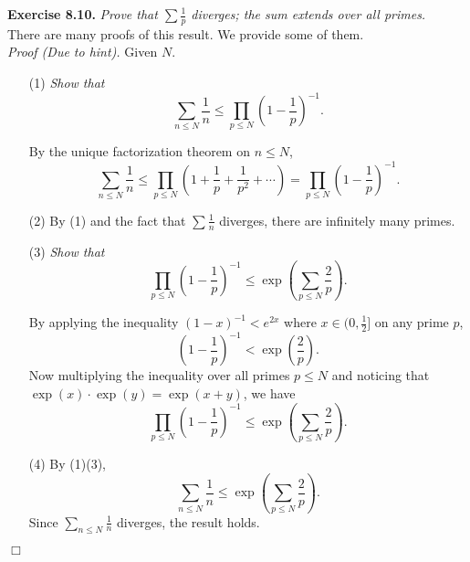 \documentclass{article}
\begin{document}
\textbf{Exercise 8.10.}
\emph{Prove that $\sum \frac{1}{p}$ diverges; the sum extends over all primes.} \\

There are many proofs of this result. We provide some of them. \\

\emph{Proof (Due to hint).}
Given $N$.
\begin{enumerate}
\item[(1)]
\emph{Show that
\[
  \sum_{n \leq N} \frac{1}{n}
  \leq \prod_{p \leq N} \left( 1 - \frac{1}{p} \right)^{-1}.
\]}

By the unique factorization theorem on $n \leq N$,
\[
  \sum_{n \leq N} \frac{1}{n}
  \leq \prod_{p \leq N} \left( 1 + \frac{1}{p} + \frac{1}{p^2} + \cdots \right)
  = \prod_{p \leq N} \left( 1 - \frac{1}{p} \right)^{-1}.
\]

\item[(2)]
By (1) and the fact that $\sum \frac{1}{n}$ diverges,
there are infinitely many primes.

\item[(3)]
\emph{Show that
\[
  \prod_{p \leq N} \left( 1 - \frac{1}{p} \right)^{-1}
  \leq \exp \left( \sum_{p \leq N} \frac{2}{p} \right).
\]}

By applying the inequality $(1 - x)^{-1} < e^{2x}$ where $x \in (0, \frac{1}{2}]$
on any prime $p$,
\[
  \left( 1 - \frac{1}{p} \right)^{-1} < \exp \left( \frac{2}{p} \right).
\]
Now multiplying the inequality over all primes $p \leq N$ and noticing that
$\exp(x) \cdot \exp(y) = \exp(x + y)$, we have
\[
  \prod_{p \leq N} \left( 1 - \frac{1}{p} \right)^{-1}
  \leq \exp \left( \sum_{p \leq N} \frac{2}{p} \right).
\]

\item[(4)]
By (1)(3),
\[
  \sum_{n \leq N} \frac{1}{n}
  \leq \exp \left( \sum_{p \leq N} \frac{2}{p} \right).
\]
Since $\sum_{n \leq N} \frac{1}{n}$ diverges, the result holds.
\end{enumerate}
$\Box$ \\
\end{document}
